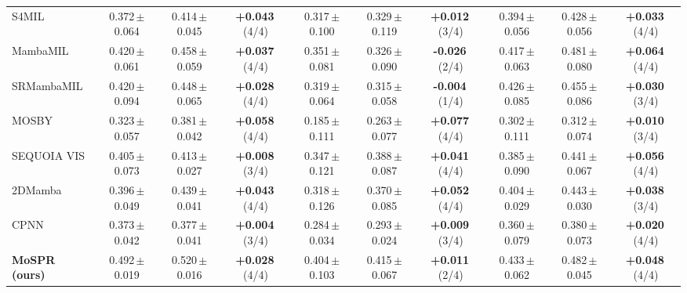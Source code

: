 \begin{tabular}{lccccccccc}
S4MIL & 0.372\,{\tiny$\pm$0.064} & 0.414\,{\tiny$\pm$0.045} & \textbf{+0.043}\,{\tiny(4/4)} & 0.317\,{\tiny$\pm$0.100} & 0.329\,{\tiny$\pm$0.119} & \textbf{+0.012}\,{\tiny(3/4)} & 0.394\,{\tiny$\pm$0.056} & 0.428\,{\tiny$\pm$0.056} & \textbf{+0.033}\,{\tiny(4/4)}\\
MambaMIL & 0.420\,{\tiny$\pm$0.061} & 0.458\,{\tiny$\pm$0.059} & \textbf{+0.037}\,{\tiny(4/4)} & 0.351\,{\tiny$\pm$0.081} & 0.326\,{\tiny$\pm$0.090} & \textbf{-0.026}\,{\tiny(2/4)} & 0.417\,{\tiny$\pm$0.063} & 0.481\,{\tiny$\pm$0.080} & \textbf{+0.064}\,{\tiny(4/4)}\\
SRMambaMIL & 0.420\,{\tiny$\pm$0.094} & 0.448\,{\tiny$\pm$0.065} & \textbf{+0.028}\,{\tiny(4/4)} & 0.319\,{\tiny$\pm$0.064} & 0.315\,{\tiny$\pm$0.058} & \textbf{-0.004}\,{\tiny(1/4)} & 0.426\,{\tiny$\pm$0.085} & 0.455\,{\tiny$\pm$0.086} & \textbf{+0.030}\,{\tiny(3/4)}\\
MOSBY & 0.323\,{\tiny$\pm$0.057} & 0.381\,{\tiny$\pm$0.042} & \textbf{+0.058}\,{\tiny(4/4)} & 0.185\,{\tiny$\pm$0.111} & 0.263\,{\tiny$\pm$0.077} & \textbf{+0.077}\,{\tiny(4/4)} & 0.302\,{\tiny$\pm$0.111} & 0.312\,{\tiny$\pm$0.074} & \textbf{+0.010}\,{\tiny(3/4)}\\
SEQUOIA VIS & 0.405\,{\tiny$\pm$0.073} & 0.413\,{\tiny$\pm$0.027} & \textbf{+0.008}\,{\tiny(3/4)} & 0.347\,{\tiny$\pm$0.121} & 0.388\,{\tiny$\pm$0.087} & \textbf{+0.041}\,{\tiny(4/4)} & 0.385\,{\tiny$\pm$0.090} & 0.441\,{\tiny$\pm$0.067} & \textbf{+0.056}\,{\tiny(4/4)}\\
2DMamba & 0.396\,{\tiny$\pm$0.049} & 0.439\,{\tiny$\pm$0.041} & \textbf{+0.043}\,{\tiny(4/4)} & 0.318\,{\tiny$\pm$0.126} & 0.370\,{\tiny$\pm$0.085} & \textbf{+0.052}\,{\tiny(4/4)} & 0.404\,{\tiny$\pm$0.029} & 0.443\,{\tiny$\pm$0.030} & \textbf{+0.038}\,{\tiny(3/4)}\\
CPNN & 0.373\,{\tiny$\pm$0.042} & 0.377\,{\tiny$\pm$0.041} & \textbf{+0.004}\,{\tiny(3/4)} & 0.284\,{\tiny$\pm$0.034} & 0.293\,{\tiny$\pm$0.024} & \textbf{+0.009}\,{\tiny(3/4)} & 0.360\,{\tiny$\pm$0.079} & 0.380\,{\tiny$\pm$0.073} & \textbf{+0.020}\,{\tiny(4/4)}\\
\textbf{MoSPR (ours)} & 0.492\,{\tiny$\pm$0.019} & 0.520\,{\tiny$\pm$0.016} & \textbf{+0.028}\,{\tiny(4/4)} & 0.404\,{\tiny$\pm$0.103} & 0.415\,{\tiny$\pm$0.067} & \textbf{+0.011}\,{\tiny(2/4)} & 0.433\,{\tiny$\pm$0.062} & 0.482\,{\tiny$\pm$0.045} & \textbf{+0.048}\,{\tiny(4/4)}\\
\bottomrule
\end{tabular}
